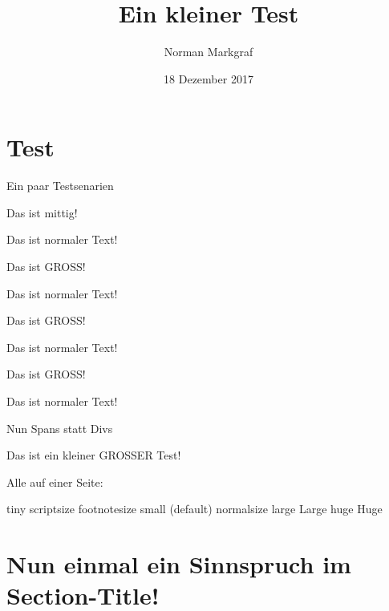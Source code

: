 \documentclass[ignorenonframetext,]{beamer}
\title{Ein kleiner Test}
\author{Norman Markgraf}
\date{18 Dezember 2017}
\begin{document}
\frame{\titlepage}

\hypertarget{test}{%
\section{Test}\label{test}}

\begin{frame}{%
\protect\hypertarget{ein-paar-testsenarien}{%
Ein paar Testsenarien}}


\begin{center}

Das ist mittig!

\end{center}

Das ist normaler Text!

{\Large{}

Das ist GROSS!

}

Das ist normaler Text!


\begin{center}
{\Large{}

Das ist GROSS!

}\end{center}

Das ist normaler Text!


\begin{center}
{\LARGE{}

Das ist GROSS!

}\end{center}

Das ist normaler Text!

\end{frame}

\begin{frame}{%
\protect\hypertarget{nun-spans-statt-divs}{%
Nun Spans statt Divs}}

Das ist {{\small{}ein kleiner}} {{\Large{}GROSSER}} Test!

\end{frame}

\begin{frame}{%
\protect\hypertarget{alle-auf-einer-seite}{%
Alle auf einer Seite:}}

{{\tiny{}tiny}} {{\scriptsize{}scriptsize}}
{{\footnotesize{}footnotesize}} {{\small{}small}} (default)
{{\normalsize{}normalsize}} {{\Large{}large}} {{\Large{}Large}}
{{\huge{}huge}} {{\Huge{}Huge}}

\end{frame}

\hypertarget{nun-einmal-ein-sinnspruch-im-section-title}{%
\section{Nun einmal ein Sinnspruch im
Section-Title!}\label{nun-einmal-ein-sinnspruch-im-section-title}}
\end{document}
